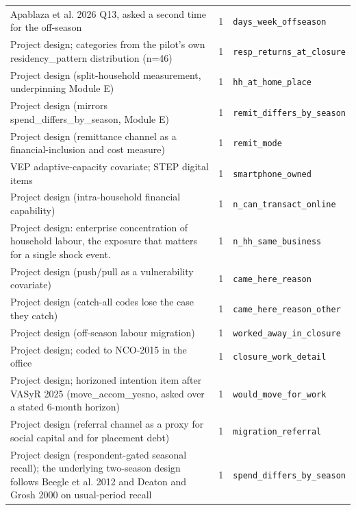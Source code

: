 \documentclass[9pt,a4paper,landscape]{article}
\begin{document}
\begin{longtable}{@{}p{9.5cm}p{1.2cm}p{12.5cm}@{}}
\scriptsize Apablaza et al. 2026 Q13, asked a second time for the off-season & \scriptsize 1 & \scriptsize\texttt{days\_week\_offseason}\\
\scriptsize Project design; categories from the pilot's own residency\_pattern distribution (n=46) & \scriptsize 1 & \scriptsize\texttt{resp\_returns\_at\_closure}\\
\scriptsize Project design (split-household measurement, underpinning Module E) & \scriptsize 1 & \scriptsize\texttt{hh\_at\_home\_place}\\
\scriptsize Project design (mirrors spend\_differs\_by\_season, Module E) & \scriptsize 1 & \scriptsize\texttt{remit\_differs\_by\_season}\\
\scriptsize Project design (remittance channel as a financial-inclusion and cost measure) & \scriptsize 1 & \scriptsize\texttt{remit\_mode}\\
\scriptsize VEP adaptive-capacity covariate; STEP digital items & \scriptsize 1 & \scriptsize\texttt{smartphone\_owned}\\
\scriptsize Project design (intra-household financial capability) & \scriptsize 1 & \scriptsize\texttt{n\_can\_transact\_online}\\
\scriptsize Project design: enterprise concentration of household labour, the exposure that matters for a single shock event. & \scriptsize 1 & \scriptsize\texttt{n\_hh\_same\_business}\\
\scriptsize Project design (push/pull as a vulnerability covariate) & \scriptsize 1 & \scriptsize\texttt{came\_here\_reason}\\
\scriptsize Project design (catch-all codes lose the case they catch) & \scriptsize 1 & \scriptsize\texttt{came\_here\_reason\_other}\\
\scriptsize Project design (off-season labour migration) & \scriptsize 1 & \scriptsize\texttt{worked\_away\_in\_closure}\\
\scriptsize Project design; coded to NCO-2015 in the office & \scriptsize 1 & \scriptsize\texttt{closure\_work\_detail}\\
\scriptsize Project design; horizoned intention item after VASyR 2025 (move\_accom\_yesno, asked over a stated 6-month horizon) & \scriptsize 1 & \scriptsize\texttt{would\_move\_for\_work}\\
\scriptsize Project design (referral channel as a proxy for social capital and for placement debt) & \scriptsize 1 & \scriptsize\texttt{migration\_referral}\\
\scriptsize Project design (respondent-gated seasonal recall); the underlying two-season design follows Beegle et al. 2012 and Deaton and Grosh 2000 on usual-period recall & \scriptsize 1 & \scriptsize\texttt{spend\_differs\_by\_season}\\

\end{longtable}
\end{document}
